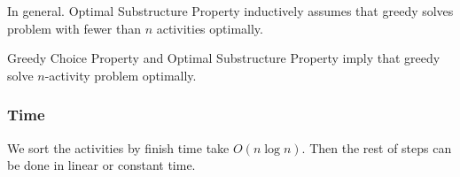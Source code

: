 In general. Optimal Substructure Property inductively assumes that greedy 
solves problem with fewer than $n$ activities optimally.

Greedy Choice Property and Optimal Substructure Property imply that greedy 
solve $n$-activity problem optimally.

\subsubsection{Time}
We sort the activities by finish time take $O(n\log n)$. Then the rest of steps 
can be done in linear or constant time.
